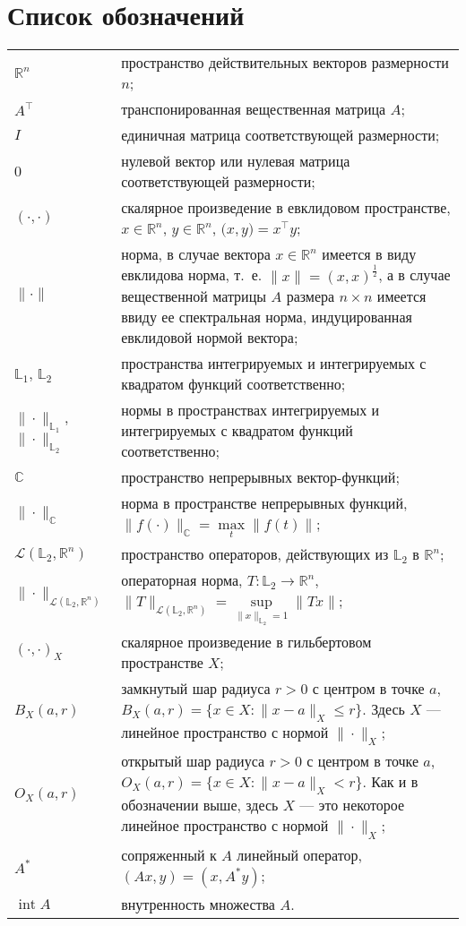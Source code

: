\documentclass[../main.tex]{subfiles}
\begin{document}
\clearpage
\section*{Список обозначений}
\begin{tabularx}{\textwidth}{lY}
 $\mathbb{R}^n$ & пространство действительных векторов размерности $n$; \\ 
 $A^{\top}$ & транспонированная вещественная матрица $A$; \\ 
 $I$ & единичная матрица соответствующей размерности; \\ 
 $0$ & нулевой вектор или нулевая матрица соответствующей размерности; \\
 $(\cdot,\cdot)$ & скалярное произведение в евклидовом пространстве, $x \in \mathbb{R}^n$, $y \in \mathbb{R}^n$, $ \Big(x, y\Big) = x^{\top} y$; \\
 $\| \cdot\| $ & норма, в случае вектора $x \in \mathbb{R}^n$ имеется в виду евклидова норма, т.~е. $\|x\| = (x,x)^{\frac{1}{2}}$, а в случае вещественной матрицы $A$ размера $n \times n$ имеется ввиду ее спектральная норма, индуцированная евклидовой нормой вектора; \\
 $\mathbb{L}_1$, $\mathbb{L}_2$ & пространства интегрируемых и интегрируемых с квадратом функций соответственно; \\
 $\|\cdot\|_{\mathbb{L}_1}$, $\|\cdot\|_{\mathbb{L}_2}$ & нормы в пространствах интегрируемых и интегрируемых с квадратом функций соответственно; \\
 $ \mathbb{C} $ & пространство непрерывных вектор-функций; \\
 $\|\cdot\|_\mathbb{C}$ & норма в пространстве непрерывных функций, $\|f(\cdot) \|_\mathbb{C} = \max\limits_{t} \|f(t)\|$; \\
 $\mathcal{L}(\mathbb{L}_2, \mathbb{R}^n)$ & пространство операторов, действующих из $\mathbb{L}_2$ в $\mathbb{R}^n$; \\ 
 $\| \cdot \|_{\mathcal{L}(\mathbb{L}_2, \mathbb{R}^n)}$ & операторная норма, $T: \mathbb{L}_2 \to \mathbb{R}^n $, $\| T \|_{\mathcal{L}(\mathbb{L}_2, \mathbb{R}^n)} = \sup\limits_{\|x\|_{\mathbb{L}_2} = 1} \| T x \| $;\\
 $(\cdot,\cdot)_{X}$ & скалярное произведение в гильбертовом пространстве $X$; \\
 $B_X(a,r)$ & замкнутый шар радиуса $r>0$ с центром в точке $a$, $B_X(a, r) = \{x\in X: \|x-a\|_X \leqslant r \}$. Здесь $X$ --- линейное пространство с нормой $\|\cdot\|_X$; \\
 $O_{X}(a, r)$ & открытый шар радиуса $r>0$ с центром в точке $a$, $O_{X}(a, r) = \{x\in X: \|x-a\|_X < r \}$. Как и в обозначении выше, здесь $X$ --- это некоторое линейное пространство с нормой $\|\cdot\|_X$; \\
 $ A^* $ & сопряженный к $A$ линейный оператор, $(Ax, y) = (x, A^*y)$; \\
 $ \operatorname{int}A $ & внутренность множества $A$. \\
\end{tabularx}
\end{document}
